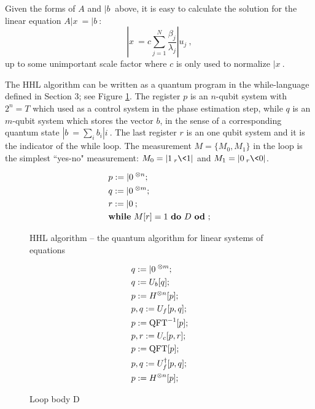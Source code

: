 Given the forms of $A$ and $|b\>$ above, it is easy to calculate the solution for the linear equation $A|x\> = |b\>$:
$$|x\> = c\sum_{j = 1}^N \frac{\beta_j}{\lambda_j}|u_j\>,$$
up to some unimportant scale factor where $c$ is only used to normalize $|x\>$.

The HHL algorithm can be written as a quantum program in the while-language defined in Section 3; see Figure \ref{fig 5}. The register $p$ is an $n$-qubit system with $2^n = T$ which used as a control system in the phase estimation step, while $q$ is an $m$-qubit system which stores the vector $b$, in the sense of a corresponding quantum state $|b\> = \sum_ib_i|i\>$. The last register $r$ is an one qubit system and it is the indicator of the while loop. The measurement $M = \{M_0,M_1\}$ in the loop is the simplest ``yes-no" measurement: $M_0 = |1\>_r\<1|$ and $M_1 = |0\>_r\<0|$.


\begin{figure}[h]
\centering
\begin{align*}
&p := |0\>^{\otimes n};\\
&q := |0\>^{\otimes m};\\
&r := |0\>;\\
&{\rm\bf while\ }M[r] = 1 {\ \rm\bf do\ } D {\ \rm\bf od\ };\\
\end{align*}
\caption{HHL algorithm -- the quantum algorithm for linear systems of equations }\label{fig 5}
\end{figure}


\begin{figure}\centering
\begin{align*}
&q := |0\>^{\otimes m}; \\
&q := U_b[q];   \\
&p := H^{\otimes n}[p]; \\
&p,q := U_f[p,q];   \\
&p := {\rm QFT}^{-1}[p];  \\
&p,r := U_c[p,r];   \\
&p := {\rm QFT}[p];  \\
&p,q := U_f^{\dag}[p,q];    \\
&p := H^{\otimes n}[p]; \\
\end{align*}
\caption{Loop body D}\label{fig 6}
\end{figure}


